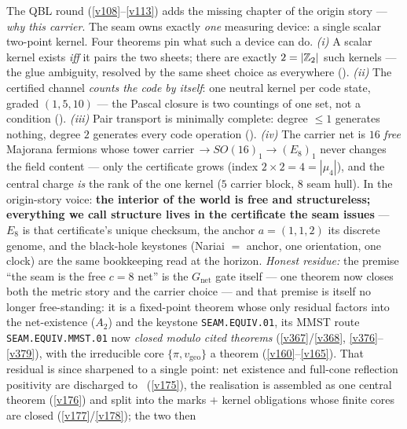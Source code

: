 \begin{keybox}
The QBL round (\vref{v108}--\vref{v113}) adds the missing chapter of the origin story --- \emph{why this carrier}. The
seam owns exactly \emph{one} measuring device: a single scalar two-point kernel. Four theorems pin what
such a device can do. \emph{(i)} A scalar kernel exists \emph{iff} it pairs the two sheets; there are
exactly $2=|\mathbb Z_2|$ such kernels --- the glue ambiguity, resolved by the same sheet choice as everywhere
(). \emph{(ii)} The certified channel \emph{counts the code by itself}:
one neutral kernel per code state, graded $(1,5,10)$ --- the Pascal closure is two countings of one set,
not a condition (). \emph{(iii)} Pair transport is minimally
complete: degree $\le1$ generates nothing, degree $2$ generates every code operation
(). \emph{(iv)} The carrier net is $16$ \emph{free} Majorana
fermions whose tower carrier$\,\to SO(16)_1\to(E_8)_1$ never changes the field content --- only the
certificate grows (index $2{\times}2=4=|\mu_4|$), and the central charge \emph{is} the rank of the one
kernel ($5$ carrier block, $8$ seam hull). In the origin-story voice: \textbf{the interior of the world
is free and structureless; everything we call structure lives in the certificate the seam issues} ---
$E_8$ is that certificate's unique checksum, the anchor $a=(1,1,2)$ its discrete genome, and the
black-hole keystones (Nariai $=$ anchor, one orientation, one clock) are the same bookkeeping read at
the horizon. \emph{Honest residue:} the premise ``the seam is the free $c{=}8$ net'' is the
$G_{\mathrm{net}}$ gate itself --- one theorem now closes both the metric story and the carrier choice ---
and that premise is itself no longer free-standing: it is a fixed-point theorem whose only residual factors
into the net-existence ($A_2$) and the keystone \texttt{SEAM.EQUIV.01}, its MMST route \texttt{SEAM.EQUIV.MMST.01}
now \emph{closed modulo cited theorems}
(\vref{v367}/\vref{v368}, \vref{v376}--\vref{v379}), with the irreducible core
$\{\pi,v_{\mathrm{geo}}\}$ a theorem (\vref{v160}--\vref{v165}). That residual is since sharpened to a
single point: net existence and full-cone reflection positivity are discharged to \mE\
(\vref{v175}), the realisation is assembled as one central theorem (\vref{v176}) and split into the
marks $+$ kernel obligations whose finite cores are closed (\vref{v177}/\vref{v178}); the two then

\end{keybox}
